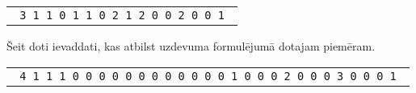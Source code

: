 \documentclass{boi2014-lv}
\begin{document}
    \begin{center}
        \begin{tabular}{p{4cm}}
            {\tt
                3 \newline
                0 1 1 \newline
                1 0 1 \newline
                1 1 0 \newline
                1 \newline
                0 2 1 2 \newline
                2 0 0 2 \newline
                1 0 0 1 \newline
            }
        \end{tabular}
    \end{center}

	Šeit doti ievaddati, kas atbilst uzdevuma formulējumā dotajam piemēram.

    \begin{center}
        \begin{tabular}{p{4cm}}
            {\tt
                4 \newline
                0 1 1 1 \newline
                1 0 0 0 \newline
                1 0 0 0 \newline
                1 0 0 0 \newline
                1 \newline
                0 0 0 0 1 \newline
                2 0 0 0 2 \newline
                3 0 0 0 3 \newline
                1 0 0 0 1 \newline
            }
        \end{tabular}
    \end{center}
\end{document}
